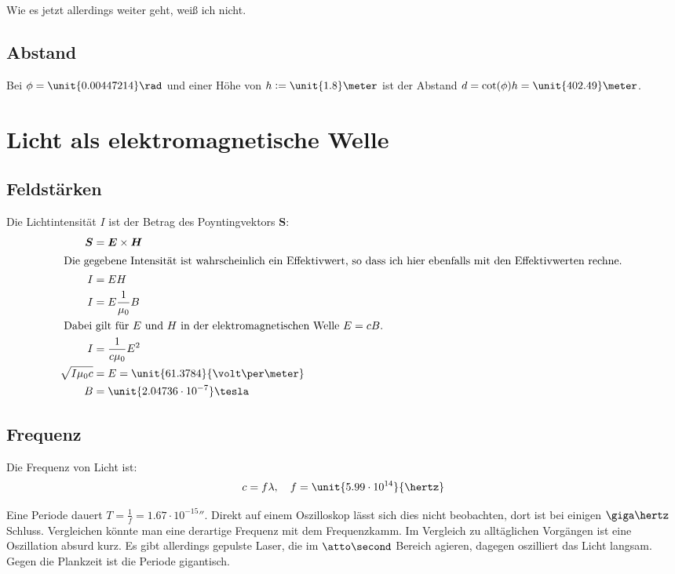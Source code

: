 \documentclass[11pt, ngerman, fleqn]{article}
\newcommand{\e}[1]{\cdot 10^{#1}}
\renewcommand{\vec}[1]{\boldsymbol{#1}}
\begin{document}
Wie es jetzt allerdings weiter geht, weiß ich nicht.

\subsection{Abstand}

Bei $\phi = \unit{0.00447214}\rad$ und einer Höhe von $h := \unit{1.8}\meter$
ist der Abstand $d = \cot(\phi) h = \unit{402.49}\meter$.


\section{Licht als elektromagnetische Welle}

\subsection{Feldstärken}

Die Lichtintensität $I$ ist der Betrag des Poyntingvektors $\vec S$:
%
\begin{align*}
	\vec S &= \vec E \times \vec H \\
	\intertext{
		Die gegebene Intensität ist wahrscheinlich ein Effektivwert, so dass
		ich hier ebenfalls mit den Effektivwerten rechne.
	}
	I &= E H \\
	I &= E \frac1{\mu_0} B \\
	\intertext{
		Dabei gilt für $E$ und $H$ in der elektromagnetischen Welle $E = c B$.
	}
	I &= \frac{1}{c\mu_0} E^2 \\
	\sqrt{I\mu_0 c} &= E = \unit{61.3784}{\volt\per\meter} \\
	B &= \unit{2.04736 \e{-7}}\tesla
\end{align*}

\subsection{Frequenz}

Die Frequenz von Licht ist:
\[
	c = f \lambda
	, \quad
	f = \unit{5.99 \e{14}}{\hertz}
\]

Eine Periode dauert $T = \frac 1f = \unit{1.67 \e{-15}}\second$. Direkt auf
einem Oszilloskop lässt sich dies nicht beobachten, dort ist bei einigen $\giga
\hertz$ Schluss. Vergleichen könnte man eine derartige Frequenz mit dem
Frequenzkamm. Im Vergleich zu alltäglichen Vorgängen ist eine Oszillation
absurd kurz. Es gibt allerdings gepulste Laser, die im $\atto \second$ Bereich
agieren, dagegen oszilliert das Licht langsam. Gegen die Plankzeit ist die
Periode gigantisch.
\end{document}
